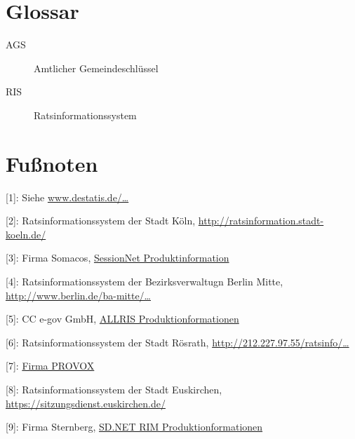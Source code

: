 \section{Glossar}

\begin{description}
\item[AGS]
Amtlicher Gemeindeschlüssel
\item[RIS]
Ratsinformationssystem
\end{description}

\section{Fußnoten}

{[}1{]}: Siehe
\href{https://www.destatis.de/DE/Methoden/Klassifikationen/Bevoelkerung/StaatsangehoerigkeitGebietsschluessel.html}{www.destatis.de/\ldots{}}

{[}2{]}: Ratsinformationssystem der Stadt Köln,
\href{http://ratsinformation.stadt-koeln.de/}{http://ratsinformation.stadt-koeln.de/}

{[}3{]}: Firma Somacos,
\href{http://www.somacos.de/de/sitzungsdienst/ratsinfo.html}{SessionNet
Produktinformation}

{[}4{]}: Ratsinformationssystem der Bezirksverwaltugn Berlin Mitte,
\href{http://www.berlin.de/ba-mitte/bvv-online/allris.net.asp}{http://www.berlin.de/ba-mitte/\ldots{}}

{[}5{]}: CC e-gov GmbH, \href{http://www.cc-egov.de/allris.htm}{ALLRIS
Produktionformationen}

{[}6{]}: Ratsinformationssystem der Stadt Rösrath,
\href{http://212.227.97.55/ratsinfo/roesrath}{http://212.227.97.55/ratsinfo/\ldots{}}

{[}7{]}: \href{http://www.provox.de/}{Firma PROVOX}

{[}8{]}: Ratsinformationssystem der Stadt Euskirchen,
\href{https://sitzungsdienst.euskirchen.de/}{https://sitzungsdienst.euskirchen.de/}

{[}9{]}: Firma Sternberg,
\href{http://www.sitzungsdienst.net/produkte/ratsinformationsmanagement}{SD.NET
RIM Produktionformationen}
